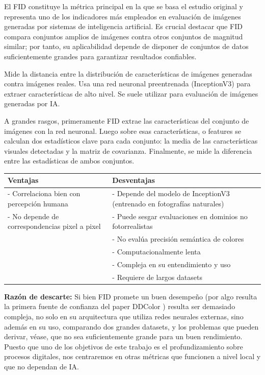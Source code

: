 \documentclass[a4paper]{article}
\begin{document}
El FID constituye la métrica principal en la que se basa el estudio original y representa uno de los indicadores más empleados en evaluación de imágenes generadas por sistemas de inteligencia artificial. Es crucial destacar que FID compara conjuntos amplios de imágenes contra otros conjuntos de magnitud similar; por tanto, su aplicabilidad depende de disponer de conjuntos de datos suficientemente grandes para garantizar resultados confiables.

Mide la distancia entre la distribución de características de imágenes generadas contra imágenes reales. Usa una red neuronal preentrenada (InceptionV3) para extraer características de alto nivel. Se suele utilizar para evaluación de imágenes generadas por IA.

A grandes rasgos, primeramente FID extrae  las características del conjunto de imágenes con la red neuronal. Luego sobre esas características, o features se calculan dos estadísticos clave para cada conjunto: la media de las características visuales detectadas y la matriz de covarianza. Finalmente, se mide la diferencia entre las estadísticas de ambos conjuntos.

\begin{table}[h]
	\centering
	\begin{tabular}{|p{}|p{}|}
		\hline
		\textbf{Ventajas} & \textbf{Desventajas} 
		\\ \hline
		- Correlaciona bien con percepción humana & - Depende del modelo de InceptionV3 (entrenado en fotografías naturales) \\
		- No depende de correspondencias pixel a pixel & - Puede sesgar evaluaciones en dominios no fotorrealistas \\
		 & - No evalúa precisión semántica de colores \\ 
		 & - Computacionalmente lenta \\ 
		 & - Compleja en su entendimiento y uso \\
		 & - Requiere de largos datasets \\ \hline
	\end{tabular}
\end{table}

\textbf{Razón de descarte:} Si bien FID promete un buen desempeño (por algo resulta la primera fuente de confianza del paper DDColor \cite{DDColor}) resulta ser demasiado compleja, no solo en su arquitectura que utiliza redes neurales externas, sino además en su uso, comparando dos grandes datasets, y los problemas que pueden derivar, véase, que no sea suficientemente grande para un buen rendimiento. Puesto que uno de los objetivos de este trabajo es el profundizamiento sobre procesos digitales, nos centraremos en otras métricas que funcionen a nivel local y que no dependan de IA. 
\end{document}
